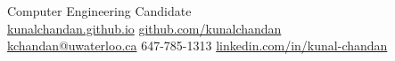 \documentclass[]{chandan-cv}
\begin{document}
%
%

%
%
{
	Computer Engineering Candidate \\
	\href{http://kunalchandan.github.io}{kunalchandan.github.io}
	\hfill
	\href{http://github.com/kunalchandan}{github.com/kunalchandan}\\
	\href{mailto:kchandan@uwaterloo.ca}{kchandan@uwaterloo.ca}
	\hfill
	647-785-1313
	\hfill
	\href{https://www.linkedin.com/in/kunal-chandan/}{linkedin.com/in/kunal-chandan}
}

%
%
\end{document}
